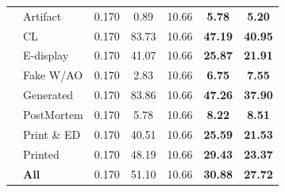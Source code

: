 \begin{table}[!htbp]
\begin{tabular}{l l c c c c c}
& Artifact       & 0.170 &   0.89 &  10.66 &        \textbf{5.78} &  \textbf{5.20} \\
& CL             & 0.170 &  83.73 &  10.66 &       \textbf{47.19} & \textbf{40.95} \\
& E-display      & 0.170 &  41.07 &  10.66 &       \textbf{25.87} & \textbf{21.91} \\
& Fake W/AO      & 0.170 &   2.83 &  10.66 &        \textbf{6.75} &  \textbf{7.55} \\
& Generated      & 0.170 &  83.86 &  10.66 &       \textbf{47.26} & \textbf{37.90} \\
& PostMortem     & 0.170 &   5.78 &  10.66 &        \textbf{8.22} &  \textbf{8.51} \\
& Print \& ED    & 0.170 &  40.51 &  10.66 &       \textbf{25.59} & \textbf{21.53} \\
& Printed        & 0.170 &  48.19 &  10.66 &       \textbf{29.43} & \textbf{23.37} \\
& \textbf{All}  & 0.170 &  51.10 &  10.66 &       \textbf{30.88} & \textbf{27.72} \\

\bottomrule
\end{tabular}
\end{table}